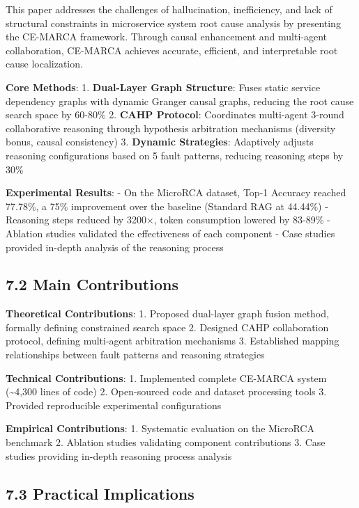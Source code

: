 This paper addresses the challenges of hallucination, inefficiency, and
lack of structural constraints in microservice system root cause
analysis by presenting the CE-MARCA framework. Through causal
enhancement and multi-agent collaboration, CE-MARCA achieves accurate,
efficient, and interpretable root cause localization.

\textbf{Core Methods}: 1. \textbf{Dual-Layer Graph Structure}: Fuses
static service dependency graphs with dynamic Granger causal graphs,
reducing the root cause search space by 60-80\% 2. \textbf{CAHP
Protocol}: Coordinates multi-agent 3-round collaborative reasoning
through hypothesis arbitration mechanisms (diversity bonus, causal
consistency) 3. \textbf{Dynamic Strategies}: Adaptively adjusts
reasoning configurations based on 5 fault patterns, reducing reasoning
steps by 30\%

\textbf{Experimental Results}: - On the MicroRCA dataset, Top-1 Accuracy
reached 77.78\%, a 75\% improvement over the baseline (Standard RAG at
44.44\%) - Reasoning steps reduced by 3200×, token consumption lowered
by 83-89\% - Ablation studies validated the effectiveness of each
component - Case studies provided in-depth analysis of the reasoning
process

\hypertarget{main-contributions}{%
\subsection{7.2 Main Contributions}\label{main-contributions}}

\textbf{Theoretical Contributions}: 1. Proposed dual-layer graph fusion
method, formally defining constrained search space 2. Designed CAHP
collaboration protocol, defining multi-agent arbitration mechanisms 3.
Established mapping relationships between fault patterns and reasoning
strategies

\textbf{Technical Contributions}: 1. Implemented complete CE-MARCA
system (\textasciitilde4,300 lines of code) 2. Open-sourced code and
dataset processing tools 3. Provided reproducible experimental
configurations

\textbf{Empirical Contributions}: 1. Systematic evaluation on the
MicroRCA benchmark 2. Ablation studies validating component
contributions 3. Case studies providing in-depth reasoning process
analysis

\hypertarget{practical-implications}{%
\subsection{7.3 Practical Implications}\label{practical-implications}}

